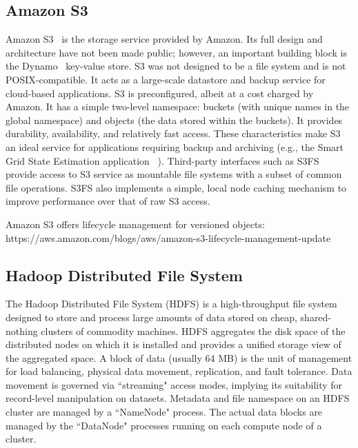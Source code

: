 \documentclass[10pt,journal,cspaper,compsoc]{IEEEtran}
\begin{document}
\subsection{Amazon S3} 
Amazon S3~\cite{s3_web} is the storage service provided by Amazon. Its full
design and architecture have not been made public; however, an important
building block is the Dynamo~\cite{dynamo} key-value store. S3 was not designed
to be a file system and is not POSIX-compatible.  It acts as a large-scale
datastore and backup service for cloud-based applications.
S3 is preconfigured, albeit at a cost charged by
Amazon. It has a simple two-level namespace: buckets (with unique names in the
global namespace) and objects (the data stored within the buckets). It provides
durability, availability, and relatively fast access. These characteristics
make S3 an ideal service for applications requiring backup and archiving (e.g.,
the Smart Grid State Estimation application ~\cite{maheshwari-lim-etal:2013}).
Third-party interfaces such as S3FS~\cite{s3fs_web} provide access to S3
service as mountable file systems with a subset of common file operations. S3FS
also implements a simple, local node caching mechanism to improve performance
over that of raw S3 access.

Amazon S3 offers lifecycle management for versioned objects: https://aws.amazon.com/blogs/aws/amazon-s3-lifecycle-management-update

\subsection{Hadoop Distributed File System}
The Hadoop Distributed File System (HDFS) is a high-throughput file system
designed to store and process large amounts of data stored on cheap,
shared-nothing clusters of commodity machines. HDFS aggregates the disk space
of the distributed nodes on which it is installed and provides a unified
storage view of the aggregated space. A block of data (usually 64 MB) is the
unit of management for load balancing, physical data movement, replication, and
fault tolerance. Data movement is governed via ``streaming" access modes,
implying its suitability for record-level manipulation on datasets. Metadata
and file namespace on an HDFS cluster are managed by a ``NameNode" process. The
actual data blocks are managed by the ``DataNode" processes running on each
compute node of a cluster. 
\end{document}
